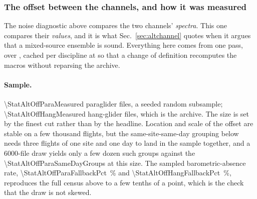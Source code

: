 \begin{revblock}
\subsubsection{The offset between the channels, and how it was measured}
\label{impl:altoffset}

The noise diagnostic above compares the two channels' \emph{spectra}. This one compares
their \emph{values}, and it is what Sec.~\ref{sec:altchannel} quotes when it argues that a
mixed-source ensemble is sound. Everything here comes from one pass,
 over
, cached per discipline at
 so that a change of definition
recomputes the macros without reparsing the archive.

\paragraph{Sample.} \num{\StatAltOffParaMeasured} paraglider files, a seeded random
subsample; \num{\StatAltOffHangMeasured} hang-glider files, which is the archive. The
size is set by the finest cut rather than by the headline. Location and scale of the
offset are stable on a few thousand flights, but the same-site-same-day grouping below
needs three flights of one site and one day to land in the sample together, and a
6000-file draw yields only a few dozen such groups against the
\num{\StatAltOffParaSameDayGroups} at this size. The sampled barometric-absence rate,
\SI{\StatAltOffParaFallbackPct}{\percent} and \SI{\StatAltOffHangFallbackPct}{\percent},
reproduces the full census above to a few tenths of a point,
which is the check that the draw is not skewed.


\end{revblock}
